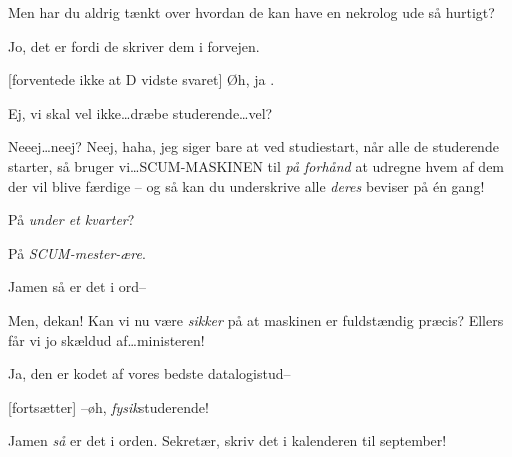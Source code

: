 \documentclass[a4paper,11pt]{article}
\begin{document}
\begin{sketch}
 Men har du aldrig tænkt over hvordan de kan have en nekrolog ude så
hurtigt?

 Jo, det er fordi de skriver dem i forvejen.

[forventede ikke at D vidste svaret] Øh, ja .



 Ej, vi skal vel ikke\ldots dræbe studerende\ldots vel?

 Neeej\ldots neej?  Neej, haha, jeg siger bare at
 ved studiestart, når alle de studerende
starter, så bruger vi\ldots SCUM-MASKINEN til \emph{på forhånd} at udregne hvem
af dem der vil blive færdige -- og så kan du underskrive alle \emph{deres}
beviser på én gang!


 På \emph{under et kvarter}?

 På \emph{SCUM-mester-ære}.

 Jamen så er det i ord--

 Men, dekan!  Kan vi nu være \emph{sikker} på at maskinen er fuldstændig
præcis?  Ellers får vi jo skældud af\ldots ministeren!


 Ja, den er kodet af vores bedste datalogistud--


[fortsætter] --øh, \emph{fysik}studerende! 


 Jamen \emph{så} er det i orden.  Sekretær, skriv det i kalenderen til
september!



\end{sketch}
\end{document}
